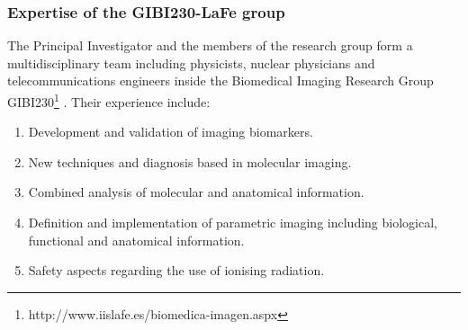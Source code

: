 \subsubsection*{Expertise of the GIBI230-LaFe group}

The Principal Investigator and the members of the research group form a multidisciplinary team including physicists, nuclear physicians and telecommunications engineers inside the Biomedical Imaging Research Group GIBI230\footnote{http://www.iislafe.es/biomedica-imagen.aspx} . Their experience include:
\begin{enumerate}
\item Development and validation of imaging biomarkers.
\item New techniques and diagnosis based in molecular imaging.
\item Combined analysis of molecular and anatomical information.
\item Definition and implementation of parametric imaging including biological, functional and anatomical information.
\item Safety aspects regarding the use of ionising radiation. 
\end{enumerate}

